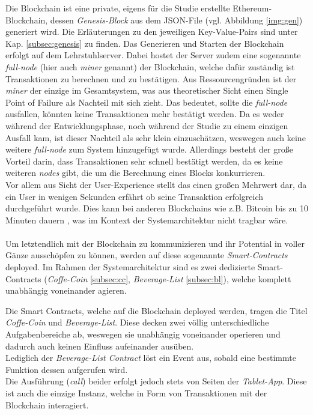 Die Blockchain ist eine private, eigens für die Studie erstellte Ethereum-Blockchain, dessen \textit{Genesis-Block} aus dem JSON-File (vgl. Abbildung \ref{img:gen}) generiert wird. Die Erläuterungen zu den jeweiligen Key-Value-Pairs sind unter Kap. \ref{subsec:genesis} zu finden.
Das Generieren und Starten der Blockchain erfolgt auf dem Lehrstuhlserver.
Dabei hostet der Server zudem eine sogenannte \textit{full-node} (hier auch \textit{miner} genannt) der Blockchain, welche dafür zuständig ist Transaktionen zu berechnen und zu bestätigen.
Aus Ressourcengründen ist der \textit{miner} der einzige im Gesamtsystem, was aus theoretischer Sicht einen Single Point of Failure als Nachteil mit sich zieht. Das bedeutet, sollte die \textit{full-node} ausfallen, könnten keine Transaktionen mehr bestätigt werden. Da es weder während der Entwicklungsphase, noch während der Studie zu einem einzigen Ausfall kam, ist dieser Nachteil als sehr klein einzuschätzen, weswegen auch keine weitere \textit{full-node} zum System hinzugefügt wurde. Allerdings besteht der große Vorteil darin, dass Transaktionen sehr schnell bestätigt werden, da es keine weiteren \textit{nodes} gibt, die um die Berechnung eines Blocks konkurrieren. \\
Vor allem aus Sicht der User-Experience stellt das einen großen Mehrwert dar, da ein User in wenigen Sekunden erfährt ob seine Transaktion erfolgreich durchgeführt wurde. Dies kann bei anderen Blockchains wie z.B. Bitcoin bis zu 10 Minuten dauern \cite{MINING:kryptopedia}, was im Kontext der Systemarchitektur nicht tragbar wäre.\\\\
Um letztendlich mit der Blockchain zu kommunizieren und ihr Potential in voller Gänze ausschöpfen zu können, werden auf diese sogenannte \textit{Smart-Contracts} deployed. Im Rahmen der Systemarchitektur sind es zwei dedizierte Smart-Contracts (\textit{Coffe-Coin} \ref{subsec:cc}, \textit{Beverage-List} \ref{subsec:bl}), welche komplett unabhängig voneinander agieren.


Die Smart Contracts, welche auf die Blockchain deployed werden, tragen die Titel \textit{Coffe-Coin} und \textit{Beverage-List}.
Diese decken zwei völlig unterschiedliche Aufgabenbereiche ab, weswegen sie  unabhängig voneinander operieren und dadurch auch keinen Einfluss aufeinander ausüben.\\
Lediglich der \textit{Beverage-List Contract} löst ein Event aus, sobald eine bestimmte Funktion dessen aufgerufen wird. \\
Die Ausführung (\textit{call}) beider erfolgt jedoch stets von Seiten der \textit{Tablet-App}. Diese ist auch die einzige Instanz, welche in Form von Transaktionen mit der Blockchain interagiert.

